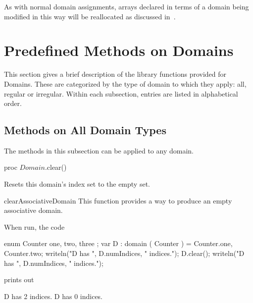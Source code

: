 As with normal domain assignments, arrays declared in terms of a
domain being modified in this way will be reallocated as discussed
in~.



\section{Predefined Methods on Domains}

This section gives a brief description of the library functions provided for
Domains.  These are categorized by the type of domain to which they apply: all,
regular or irregular.  Within each subsection, entries are listed in
alphabetical order.

\subsection{Methods on All Domain Types}

The methods in this subsection can be applied to any domain.

\begin{protohead}
proc $Domain$.clear()
\end{protohead}
\begin{protobody}
Resets this domain's index set to the empty set.
\end{protobody}

\begin{chapelexample}{clearAssociativeDomain}
This function provides a way to produce an empty associative domain.

When run, the code
\begin{chapel}
enum Counter { one, two, three };
var D : domain ( Counter ) = {Counter.one, Counter.two};
writeln("D has ", D.numIndices, " indices.");
D.clear();
writeln("D has ", D.numIndices, " indices.");
\end{chapel}
prints out
\begin{chapelprintoutput}{}
D has 2 indices.
D has 0 indices.
\end{chapelprintoutput}
\end{chapelexample}

